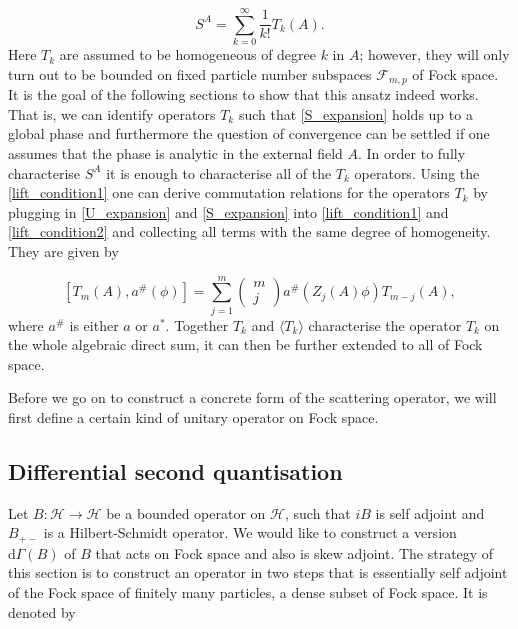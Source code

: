 \documentclass[b5paper,draft,openbib,12pt]{memoir}
\begin{document}
\begin{equation}\label{S_expansion}
S^A=\sum_{k=0}^\infty \frac{1}{k!} T_k(A).
\end{equation}
Here \(T_k\) are assumed to be homogeneous of degree \(k\) in \(A\); however, they will only turn out to be bounded on
fixed particle number subspaces \(\mathcal{F}_{m,p}\) of Fock space. It is the goal of the following  sections to
show that this ansatz indeed works. That is, we can identify operators \(T_k\) such that \eqref{S_expansion}
holds up to a global phase and furthermore the question of convergence can be settled if one assumes that 
the phase is analytic in the external field \(A\). %
In order to fully characterise \(S^A\) it is enough to characterise all of the \(T_k\) operators. 
Using the \eqref{lift_condition1} one can derive commutation relations for the operators 
\(T_k\) by plugging in \eqref{U_expansion} and \eqref{S_expansion} into \eqref{lift_condition1} and \eqref{lift_condition2}
and collecting all terms with the same degree of homogeneity. They are given by

\begin{equation}\label{logarithmic lift condition}
\left[T_m(A) , a^\# (\phi)\right]= \sum_{j=1}^{m} \begin{pmatrix} m \\ j \end{pmatrix} a^\# \left(Z_j (A) \phi \right) T_{m-j}(A), 
\end{equation}
where \(a^\#\) is either \(a\) or \(a^*\). Together \(T_k\) and \(\langle T_k\rangle\) characterise the operator \(T_k\) on the whole algebraic
direct sum, it can then be further extended to all of Fock space.

Before we go on to construct a concrete form of the scattering operator, we will first define a certain kind of unitary operator on Fock space.

\subsection{Differential second quantisation}

Let \(B:\mathcal{H}\rightarrow\mathcal{H}\) be a bounded
operator on \(\mathcal{H}\), such that \(i B\) is self adjoint and \(B_{+-}\) is a Hilbert-Schmidt operator. 
We would like to construct a version \(\mathrm{d}\Gamma(B)\) of \(B\) that acts on Fock space and also is skew adjoint.
The strategy of this section is to construct an operator in two steps that is essentially self adjoint of the Fock space of 
finitely many particles, a dense subset of Fock space. It is denoted by
\end{document}
